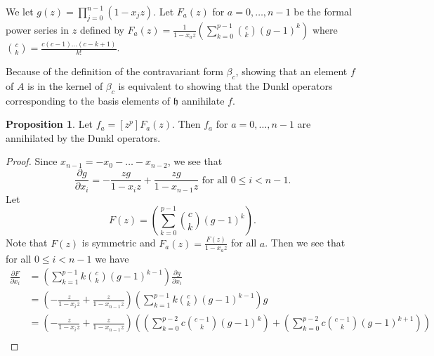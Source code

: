 \documentclass{amsart}
\numberwithin{equation}{section}
\theoremstyle{definition}
\newtheorem{proposition}[equation]{Proposition}
\newcommand{\h}{\mathfrak{h}}
\begin{document}
We let $g(z)=\prod_{j=0}^{n-1} (1-x_jz)$. Let $F_a(z)$ for $a=0,\dots,n-1$ be the formal power series in $z$ defined by $F_a(z)=\frac{1}{1-x_az} \left( \sum_{k=0}^{p-1} \binom{c}{k}(g-1)^k\right)$ where $\binom{c}{k}=\frac{c(c-1)\dots(c-k+1)}{k!}$. 

Because of the definition of the contravariant form $\beta_c$, showing that an element $f$ of $A$ is in the kernel of $\beta_c$ is equivalent to showing that the Dunkl operators corresponding to the basis elements of $\h$ annihilate $f$.

\begin{proposition}\label{prop:ann} Let $f_a=[z^p]F_a(z)$. Then $f_a$ for $a=0,\dots,n-1$ are annihilated by the Dunkl operators. 
\end{proposition}

\begin{proof}
Since $x_{n-1}=-x_0-\dots-x_{n-2}$, we see that
\[
\frac{\partial g}{\partial x_i}=-\frac{zg}{1-x_iz}+\frac{zg}{1-x_{n-1}z} \text{ for all $0 \le i < n-1$}.
\]
Let 
\[
F(z) =\left(\sum_{k=0}^{p-1} \binom{c}{k} (g-1)^k\right).
\]
Note that $F(z)$ is symmetric and $F_a(z)=\frac{F(z)}{1-x_az}$ for all $a$. Then we see that for all $0 \le i < n-1$ we have 
\begin{align*}
\frac{\partial F}{\partial x_i}%
&=\left(\sum_{k=1}^{p-1}k\binom{c}{k}(g-1)^{k-1}\right)\frac{\partial g}{\partial x_i}\\
&=\left(-\frac{z}{1-x_iz}+\frac{z}{1-x_{n-1}z}\right)\left(\sum_{k=1}^{p-1}k\binom{c}{k}(g-1)^{k-1}\right)g\\
&=\left(-\frac{z}{1-x_iz}+\frac{z}{1-x_{n-1}z}\right)\left(\left(\sum_{k=0}^{p-2}c\binom{c-1}{k}(g-1)^{k}\right)+\left(\sum_{k=0}^{p-2}c\binom{c-1}{k}(g-1)^{k+1}\right)\right)\\

\end{align*}
\end{proof}
\end{document}
